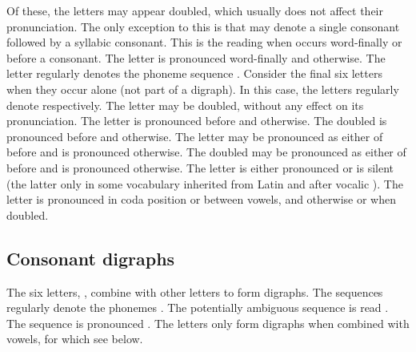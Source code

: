 Of these, the letters  may appear doubled, which usually does not affect their pronunciation. 
The only exception to this is that  may denote a single consonant followed by a syllabic consonant. This is the reading when  occurs word-finally or before a consonant.
The letter  is pronounced  word-finally and  otherwise.
The letter  regularly denotes the phoneme sequence .
Consider the final six letters  when they occur alone (not part of a digraph). In this case, the letters  regularly denote  respectively. The letter  may be doubled, without any effect on its pronunciation.
The letter  is pronounced  before  and  otherwise. The doubled  is pronounced  before  and  otherwise.
The letter  may be pronounced as either of  before  and is pronounced  otherwise. The doubled  may be pronounced as either of  before  and is pronounced  otherwise.
The letter  is either pronounced  or is silent (the latter only in some vocabulary inherited from Latin and after vocalic ).
The letter  is pronounced  in coda position or between vowels, and  otherwise or when doubled.

\subsection{Consonant digraphs}

The six letters, , combine with other letters to form digraphs. The sequences  regularly denote the phonemes . The potentially ambiguous sequence  is read .
The sequence  is pronounced .
The letters  only form digraphs when combined with vowels, for which see below.  

